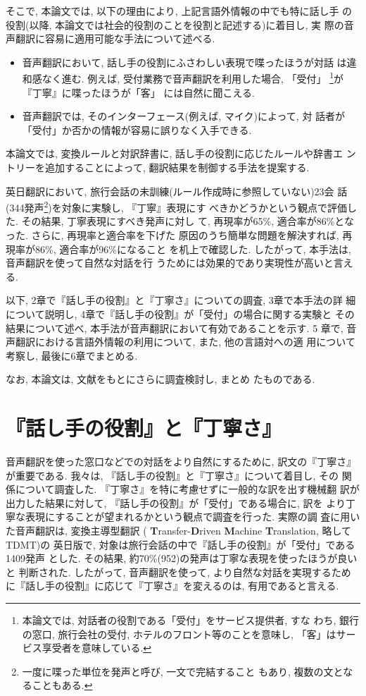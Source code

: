 そこで, 本論文では, 以下の理由により, 上記言語外情報の中でも特に話し手
の役割(以降, 本論文では社会的役割のことを役割と記述する)に着目し, 実
際の音声翻訳に容易に適用可能な手法について述べる. 
\begin{itemize}
\item 音声翻訳において, 話し手の役割にふさわしい表現で喋ったほうが対話
は違和感なく進む. 例えば, 受付業務で音声翻訳を利用した場合, 「受付」
\footnote{本論文では, 対話者の役割である「受付」をサービス提供者, すな
わち, 銀行の窓口, 旅行会社の受付, ホテルのフロント等のことを意味し, 
「客」はサービス享受者を意味している. }が『丁寧』に喋ったほうが「客」
には自然に聞こえる. 
\item 音声翻訳では, そのインターフェース(例えば, マイク)によって, 対
話者が「受付」か否かの情報が容易に誤りなく入手できる. 
\end{itemize}

本論文では, 変換ルールと対訳辞書に, 話し手の役割に応じたルールや辞書エ
ントリーを追加することによって, 翻訳結果を制御する手法を提案する. 

英日翻訳において, 旅行会話の未訓練(ルール作成時に参照していない)23会
話(344発声\footnote{一度に喋った単位を発声と呼び, 一文で完結すること
もあり, 複数の文となることもある. })を対象に実験し, 『丁寧』表現にす
べきかどうかという観点で評価した. その結果, 丁寧表現にすべき発声に対し
て, 再現率が65\%, 適合率が86\%となった. さらに, 再現率と適合率を下げた
原因のうち簡単な問題を解決すれば, 再現率が86\%, 適合率が96\%になること
を机上で確認した. したがって, 本手法は, 音声翻訳を使って自然な対話を行
うためには効果的であり実現性が高いと言える. 

以下, 2章で『話し手の役割』と『丁寧さ』についての調査, 3章で本手法の詳
細について説明し, 4章で『話し手の役割』が「受付」の場合に関する実験と
その結果について述べ, 本手法が音声翻訳において有効であることを示す. 5
章で, 音声翻訳における言語外情報の利用について, また, 他の言語対への適
用について考察し, 最後に6章でまとめる. 

なお, 本論文は, 文献\cite{Yamada:2000}をもとにさらに調査検討し, まとめ
たものである. 

\section{『話し手の役割』と『丁寧さ』}
\label{sec:role and politeness}

音声翻訳を使った窓口などでの対話をより自然にするために, 訳文の『丁寧さ』
が重要である. 我々は, 『話し手の役割』と『丁寧さ』について着目し, その
関係について調査した. 『丁寧さ』を特に考慮せずに一般的な訳を出す機械翻
訳が出力した結果に対して, 『話し手の役割』が「受付」である場合に, 訳を
より丁寧な表現にすることが望まれるかという観点で調査を行った. 実際の調
査に用いた音声翻訳は, 変換主導型翻訳\cite{Sumita:1999} ({\bf
T}ransfer-{\bf D}riven {\bf M}achine {\bf T}ranslation, 略してTDMT)の
英日版で, 対象は旅行会話の中で『話し手の役割』が「受付」である1409発声
とした. その結果, 約70\%(952)の発声は丁寧な表現を使ったほうが良いと
判断された. したがって, 音声翻訳を使って, より自然な対話を実現するため
に『話し手の役割』に応じて『丁寧さ』を変えるのは, 有用であると言える. 

